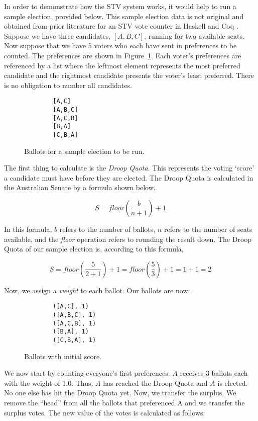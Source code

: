 In order to demonstrate how the STV system works, it would help to run a sample
election, provided below. This sample election data is not original and obtained
from prior literature for an STV vote counter in Haskell and Coq
\cite{stv_haskell}. Suppose we have three candidates, $[A, B, C]$, running for
two available seats. Now suppose that we have 5 voters who each have sent in
preferences to be counted. The preferences are shown in
Figure~\ref{sample_election}. Each voter's preferences are referenced by a list
where the leftmost element represents the most preferred candidate and the
rightmost candidate presents the voter's least preferred. There is no obligation
to number all candidates. 


\begin{figure}[ht!!!!!!!!]
    \caption{Ballots for a sample election to be run. }
    \label{sample_election}
    \begin{lstlisting}
        [A,C]
        [A,B,C]
        [A,C,B]
        [B,A]
        [C,B,A]
    \end{lstlisting}
\end{figure}

The first thing to calculate is the \textit{Droop Quota}. This represents the
voting `score' a candidate must have before they are elected. The Droop Quota is
calculated in the Australian Senate by a formula shown below. 

$$
S = floor(\frac{b}{n + 1}) + 1
$$

In this formula, $b$ refers to the number of ballots, $n$ refers to the number
of seats available, and the \textit{floor} operation refers to rounding the
result down. The Droop Quota of our sample election is, according to this formula, 

$$
S = floor(\frac{5}{2 + 1}) + 1 = floor(\frac{5}{3}) + 1 = 1 + 1 = 2
$$

Now, we assign a \textit{weight} to each ballot. Our ballots are now: 

\begin{figure}[ht!!!!!!!!]
    \caption{Ballots with initial score.}
    \label{sample_election0}
    \begin{lstlisting}
        ([A,C], 1)
        ([A,B,C], 1)
        ([A,C,B], 1)
        ([B,A], 1)
        ([C,B,A], 1)
    \end{lstlisting}
\end{figure}

We now start by counting everyone's first preferences. $A$ receives 3 ballots
each with the weight of 1.0. Thus, $A$ has reached the Droop Quota and $A$ is
elected. No one else has hit the Droop Quota yet. Now, we transfer the surplus.
We remove the ``head'' from all the ballots that preferenced A and we transfer
the surplus votes. The new value of the votes is calculated as follows: 

